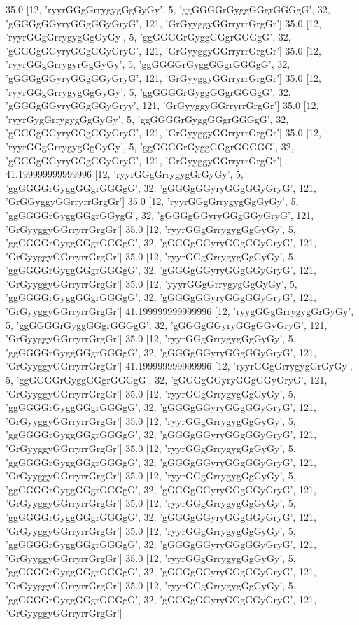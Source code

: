35.0 [12, 'ryyrGGgGrrygygGgGyGy', 5, 'ggGGGGrGyggGGgrGGGgG', 32, 'gGGGgGGyryGGgGGyGryG', 121, 'GrGyyggyGGrryrrGrgGr']
35.0 [12, 'ryyrGGgGrrygygGgGyGy', 5, 'ggGGGGrGyggGGgrGGGgG', 32, 'gGGGgGGyryGGgGGyGryG', 121, 'GrGyyggyGGrryrrGrgGr']
35.0 [12, 'ryyrGGgGrrygyrGgGyGy', 5, 'ggGGGGrGyggGGgrGGGgG', 32, 'gGGGgGGyryGGgGGyGryG', 121, 'GrGyyggyGGrryrrGrgGr']
35.0 [12, 'ryyrGGgGrrygygGgGyGy', 5, 'ggGGGGrGyggGGgrGGGgG', 32, 'gGGGgGGyryGGgGGyGryy', 121, 'GrGyyggyGGrryrrGrgGr']
35.0 [12, 'ryyrGygGrrygygGgGyGy', 5, 'ggGGGGrGyggGGgrGGGgG', 32, 'gGGGgGGyryGGgGGyGryG', 121, 'GrGyyggyGGrryrrGrgGr']
35.0 [12, 'ryyrGGgGrrygygGgGyGy', 5, 'ggGGGGrGyggGGgrGGGGG', 32, 'gGGGgGGyryGGgGGyGryG', 121, 'GrGyyggyGGrryrrGrgGr']
41.199999999999996 [12, 'ryyrGGgGrrygygGrGyGy', 5, 'ggGGGGrGyggGGgrGGGgG', 32, 'gGGGgGGyryGGgGGyGryG', 121, 'GrGGyggyGGrryrrGrgGr']
35.0 [12, 'ryyrGGgGrrygygGgGyGy', 5, 'ggGGGGrGyggGGgrGGygG', 32, 'gGGGgGGyryGGgGGyGryG', 121, 'GrGyyggyGGrryrrGrgGr']
35.0 [12, 'ryyrGGgGrrygygGgGyGy', 5, 'ggGGGGrGyggGGgrGGGgG', 32, 'gGGGgGGyryGGgGGyGryG', 121, 'GrGyyggyGGrryrrGrgGr']
35.0 [12, 'ryyrGGgGrrygygGgGyGy', 5, 'ggGGGGrGyggGGgrGGGgG', 32, 'gGGGgGGyryGGgGGyGryG', 121, 'GrGyyggyGGrryrrGrgGr']
35.0 [12, 'yyyrGGgGrrygygGgGyGy', 5, 'ggGGGGrGyggGGgrGGGgG', 32, 'gGGGgGGyryGGgGGyGryG', 121, 'GrGyyggyGGrryrrGrgGr']
41.199999999999996 [12, 'ryygGGgGrrygygGrGyGy', 5, 'ggGGGGrGyggGGgrGGGgG', 32, 'gGGGgGGyryGGgGGyGryG', 121, 'GrGyyggyGGrryrrGrgGr']
35.0 [12, 'ryyrGGgGrrygygGgGyGy', 5, 'ggGGGGrGyggGGgrGGGgG', 32, 'gGGGgGGyryGGgGGyGryG', 121, 'GrGyyggyGGrryrrGrgGr']
41.199999999999996 [12, 'ryyrGGgGrrygygGrGyGy', 5, 'ggGGGGrGyggGGgrGGGgG', 32, 'gGGGgGGyryGGgGGyGryG', 121, 'GrGyyggyGGrryrrGrgGr']
35.0 [12, 'ryyrGGgGrrygygGgGyGy', 5, 'ggGGGGrGyggGGgrGGGgG', 32, 'gGGGgGGyryGGgGGyGryG', 121, 'GrGyyggyGGrryrrGrgGr']
35.0 [12, 'ryyrGGgGrrygygGgGyGy', 5, 'ggGGGGrGyggGGgrGGGgG', 32, 'gGGGgGGyryGGgGGyGryG', 121, 'GrGyyggyGGrryrrGrgGr']
35.0 [12, 'ryyrGGgGrrygygGgGyGy', 5, 'ggGGGGrGyggGGgrGGGgG', 32, 'gGGGgGGyryGGgGGyGryG', 121, 'GrGyyggyGGrryrrGrgGr']
35.0 [12, 'ryyrGGgGrrygygGgGyGy', 5, 'ggGGGGrGyggGGgrGGGgG', 32, 'gGGGgGGyryGGgGGyGryG', 121, 'GrGyyggyGGrryrrGrgGr']
35.0 [12, 'ryyrGGgGrrygygGgGyGy', 5, 'ggGGGGrGyggGGgrGGGgG', 32, 'gGGGgGGyryGGgGGyGryG', 121, 'GrGyyggyGGrryrrGrgGr']
35.0 [12, 'ryyrGGgGrrygygGgGyGy', 5, 'ggGGGGrGyggGGgrGGGgG', 32, 'gGGGgGGyryGGgGGyGryG', 121, 'GrGyyggyGGrryrrGrgGr']
35.0 [12, 'ryyrGGgGrrygygGgGyGy', 5, 'ggGGGGrGyggGGgrGGGgG', 32, 'gGGGgGGyryGGgGGyGryG', 121, 'GrGyyggyGGrryrrGrgGr']
35.0 [12, 'ryyrGGgGrrygygGgGyGy', 5, 'ggGGGGrGyggGGgrGGGgG', 32, 'gGGGgGGyryGGgGGyGryG', 121, 'GrGyyggyGGrryrrGrgGr']

